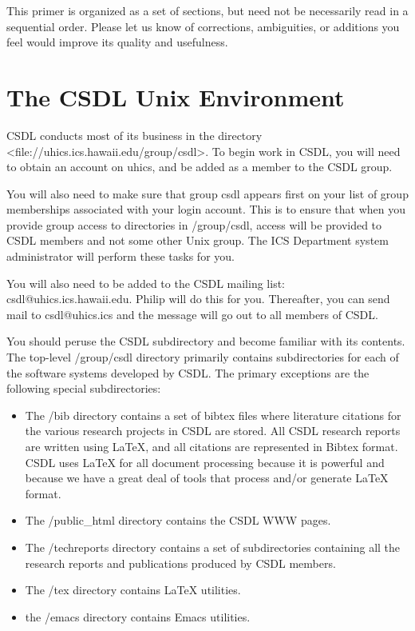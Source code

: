 This primer is organized as a set of sections, but need not be
necessarily read in a sequential order.  Please let us know of
corrections, ambiguities, or additions you feel would improve its
quality and usefulness.

\section {The CSDL Unix Environment}

CSDL conducts most of its business in the directory
<file://uhics.ics.hawaii.edu/group/csdl>.  To begin work in CSDL, you
will need to obtain an account on uhics, and be added as a member to 
the CSDL group.  

You will also need to make sure that group csdl appears first on your
list of group memberships associated with your login account.  This is
to ensure that when you provide group access to directories in
/group/csdl, access will be provided to CSDL members and not some
other Unix group.  The ICS Department system administrator will
perform these tasks for you.

You will also need to be added to the CSDL mailing list:
csdl@uhics.ics.hawaii.edu.  Philip will do this for you. Thereafter,
you can send mail to csdl@uhics.ics and the message will go out to all
members of CSDL.

You should peruse the CSDL subdirectory and become familiar with its
contents.  The top-level /group/csdl directory primarily contains
subdirectories for each of the software systems developed by CSDL. 
The primary exceptions are the following special subdirectories:
\begin{itemize}

\item The /bib directory contains a set of bibtex files where literature
citations for the various research projects in CSDL are stored.  All
CSDL research reports are written using LaTeX, and all citations are
represented in Bibtex format.  CSDL uses LaTeX for all document
processing because it is powerful and because we have a great deal of
tools that process and/or generate LaTeX format.   

\item The /public_html directory contains the CSDL WWW pages. 

\item The /techreports directory contains a set of subdirectories containing
all the research reports and publications produced by CSDL members.

\item The /tex directory contains LaTeX utilities.

\item the /emacs directory contains Emacs utilities. 
\end{itemize}

